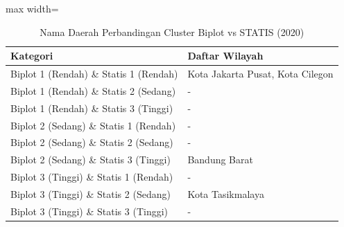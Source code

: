 \begin{table}[H]
\centering
\caption{Nama Daerah Perbandingan Cluster Biplot vs STATIS (2020)} \label{tab:samplebiplot_statis_comp_name_2020}
\begin{adjustbox}{max width=\textwidth}
\begin{tabular}{|p{4cm}|p{10cm}|}
\hline
\textbf{Kategori} & \textbf{Daftar Wilayah} \\
\hline
Biplot 1 (Rendah) \& Statis 1 (Rendah) & Kota Jakarta Pusat, Kota Cilegon \\
\hline
Biplot 1 (Rendah) \& Statis 2 (Sedang) & - \\
\hline
Biplot 1 (Rendah) \& Statis 3 (Tinggi) & - \\
\hline
Biplot 2 (Sedang) \& Statis 1 (Rendah) & - \\
\hline
Biplot 2 (Sedang) \& Statis 2 (Sedang) & - \\
\hline
Biplot 2 (Sedang) \& Statis 3 (Tinggi) & Bandung Barat \\
\hline
Biplot 3 (Tinggi) \& Statis 1 (Rendah) & - \\
\hline
Biplot 3 (Tinggi) \& Statis 2 (Sedang) & Kota Tasikmalaya \\
\hline
Biplot 3 (Tinggi) \& Statis 3 (Tinggi) & - \\
\hline
\end{tabular}
\end{adjustbox}
\end{table}